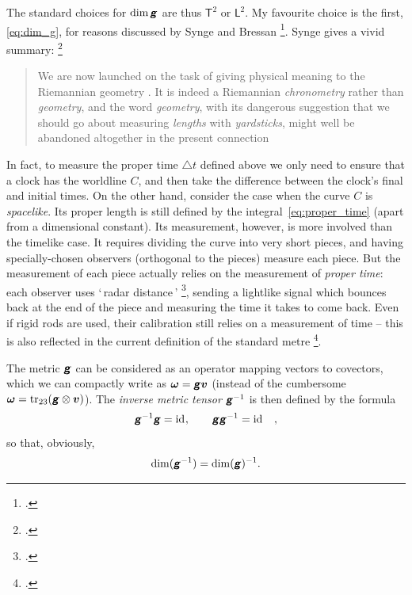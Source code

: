 \documentclass[\ifafour a4paper,12pt,\else a5paper,10pt,\fi%
onecolumn,oneside,article,%
british%
]{memoir}
\makeatletter
\newcommand*{\defquote}[1]{`\,#1\,'}
\theoremstyle{remark}
\theoremstyle{innote}
\newcommand*{\mathte}[1]{\textbf{\textit{\textsf{#1}}}}
\newcommand*{\citep}{\footcites}
\DeclareMathOperator{\tr}{tr}%
\newcommand*{\incr}{\triangle}%
\newcommand*{\defd}{\coloneqq}
\renewcommand*{\|}[1][]{\nonscript\,#1\vert\nonscript\;\mathopen{}}
\newcommand*{\sect}{\S}%
\newcommand*{\sects}{\S\S}%
\newcommand*{\q}{}%
\DeclareRobustCommand*{\q}{%
  \mathbin{\mathpalette\bigcdot@{}}%
}
\newcommand*{\bigcdot@scalefactor}{0.75}
\newcommand*{\bigcdot@widthfactor}{1.5}
\newcommand*{\bigcdot@}[2]{%
  \sbox0{$#1\vcenter{}$}%
  \sbox2{$#1\cdot\m@th$}%
  \hbox to \bigcdot@widthfactor\wd2{%
    \hfil
    \raise\ht0\hbox{%
      \scalebox{\bigcdot@scalefactor}{%
        \lower\ht0\hbox{$#1\bullet\m@th$}%
      }%
    }%
    \hfil
  }%
}
\newcommand*{\Un}{\textsf{1}}
\newcommand*{\Le}{\textsf{L}}
\newcommand*{\Ti}{\textsf{T}}
\newcommand*{\yg}{\mathte{g}}
\newcommand*{\yom}{\bm{\omega}}
\newcommand*{\yv}{\bm{v}}
\renewcommand*{\i}{\indices}
\newcommand*{\inct}{\incr t}
\newcommand*{\id}{\mathrm{id}}%
\makeatother
\begin{document}
The standard choices for $\dim{\yg}$ are thus $\Ti^{2}$ or $\Le^{2}$. My
favourite choice is the first, \eqref{eq:dim_g}, for reasons discussed by
Synge and Bressan \citep[\sects~III.2--4]{synge1960b}[\sects~15,
18]{bressan1978}. Synge gives a vivid summary: \citep[\sect~III.3
pp.~108--109]{synge1960b}
\begin{quote}\footnotesize
  We are now launched on the task of giving physical meaning to the
  Riemannian geometry \textelp{}. It is indeed a Riemannian
  \emph{chronometry} rather than \emph{geometry}, and the word
  \emph{geometry}, with its dangerous suggestion that we should go about
  measuring \emph{lengths} with \emph{yardsticks}, might well be abandoned
  altogether in the present connection\end{quote} In fact, to measure the
proper time $\inct$ defined above we only need to ensure that a clock has
the worldline $C$, and then take the difference between the clock's final
and initial times. On the other hand, consider the case when the curve $C$
is \emph{spacelike}. Its proper length is still defined by the
integral~\eqref{eq:proper_time} (apart from a dimensional constant). Its
measurement, however, is more involved than the timelike case. It requires
dividing the curve into very short pieces, and having specially-chosen
observers (orthogonal to the pieces) measure each piece. But the
measurement of each piece actually relies on the measurement of
\emph{proper time}: each observer uses \defquote{radar distance}
\citep[\sect~84]{landauetal1939_t1996}, sending a lightlike signal which
bounces back at the end of the piece and measuring the time it takes to
come back. Even if rigid rods are used, their calibration still relies on a
measurement of time -- this is also reflected in the current definition of
the standard metre \citep[p.~98]{bipm1983}[p.~25]{giacomo1984}.


\medskip

The metric $\yg$ can be considered as an operator mapping vectors to
covectors, which we can compactly write as $\yom=\yg\yv$ (instead of the cumbersome
$\yom = \tr_{23}(\yg\otimes\yv)$). The \emph{inverse metric tensor}
$\yg\i{^{-1}^{\q\q}}$ is then defined by the formula
\begin{equation}
  \label{eq:inverse_g}
  \yg^{-1}\yg = \id\i{^{\q}_{\q}},\qquad
  \yg\yg^{-1} = \id\i{_{\q}^{\q}}\quad,
\end{equation}
so that, obviously,
\begin{equation}
  \label{eq:dim_ig}
  \dim(\yg^{-1}) = \dim(\yg)^{-1}.
\end{equation}
\end{document}
